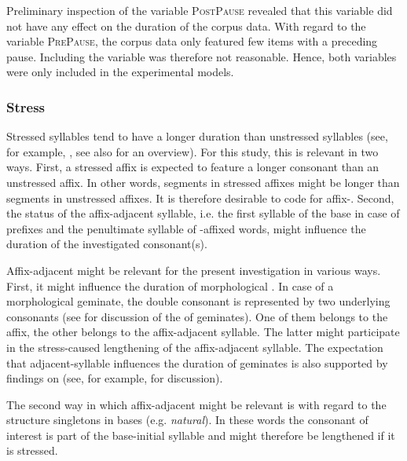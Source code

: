 Preliminary inspection of the variable \textsc{PostPause} revealed that this variable did not have any effect on the duration of the corpus data. With regard to the variable \textsc{PrePause}, the corpus data only featured few items with a preceding pause.  Including the variable was therefore not reasonable. Hence, both variables were only included in the experimental models.

\subsubsection{Stress} \label{stress coding} Stressed syllables tend to have a longer duration than unstressed syllables (see, for example, \citealt{Fry.1955, Fry.1958, Lieberman.1960, Beckman.1986, Eriksson.2016}, see also \citealt{Laver.1994} for an overview). For this study, this is relevant in two ways.  First, a stressed affix is expected to feature a longer consonant than an unstressed affix. In other words, segments in stressed affixes might be longer than segments in unstressed affixes. It is therefore desirable to code for affix-.
Second, the  status of the affix-adjacent syllable, i.e. the first syllable of the base in case of prefixes and the penultimate syllable of -affixed words, might influence the duration of the investigated consonant(s). 

Affix-adjacent  might be relevant  for the present investigation in various ways. First, it might influence the duration of morphological . In case of a {morphological geminate}, the double consonant is represented by two underlying consonants (see  for discussion of the  of {geminates}). One of them belongs to the affix, the other belongs to the affix-adjacent syllable. The latter might participate in the stress-caused lengthening of the affix-adjacent syllable.  The expectation that adjacent-syllable  influences the duration of {geminates} is also supported by findings on  (see, for example, \citealt{Dmitrieva.2017} for discussion).

The second way in which affix-adjacent  might be relevant is with regard to the structure singletons in bases (e.g. \textit{natural}). In these words the consonant of interest is part of the base-initial syllable and might therefore be lengthened if it is stressed. 

